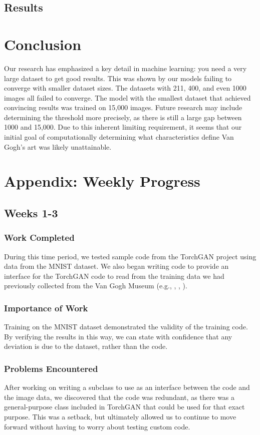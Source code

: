 \documentclass[12pt,letterpaper]{article}
\begin{document}
		\subsection{Results}

	\section{Conclusion}
		Our research has emphasized a key detail in machine learning: you need a very large dataset to get good results.
		This was shown by our models failing to converge with smaller dataset sizes.
		The datasets with 211, 400, and even 1000 images all failed to converge.
		The model with the smallest dataset that achieved convincing results was trained on 15,000 images.
		Future research may include determining the threshold more precisely, as there is still a large gap between 1000 and 15,000.
		Due to this inherent limiting requirement, it seems that our initial goal of computationally determining what characteristics define Van Gogh's art was likely unattainable.

\appendix
	\section{Appendix: Weekly Progress}
		\subsection{Weeks 1-3}
		\label{subsec:weekly:1-3}
			\subsubsection{Work Completed}
				During this time period, we tested sample code from the TorchGAN\cite{pal2019torchgan} project using data from the MNIST\cite{lecun2010mnist} dataset.
				We also began writing code to provide an interface for the TorchGAN code to read from the training data we had previously collected from the Van Gogh Museum (e.g., \cite{001}, \cite{002}, \cite{003}).
			\subsubsection{Importance of Work}
				Training on the MNIST dataset demonstrated the validity of the training code.
				By verifying the results in this way, we can state with confidence that any deviation is due to the dataset, rather than the code.
			\subsubsection{Problems Encountered}
				After working on writing a subclass to use as an interface between the code and the image data, we discovered that the code was redundant, as there was a general-purpose class included in TorchGAN that could be used for that exact purpose.
				This was a setback, but ultimately allowed us to continue to move forward without having to worry about testing custom code.
\end{document}
